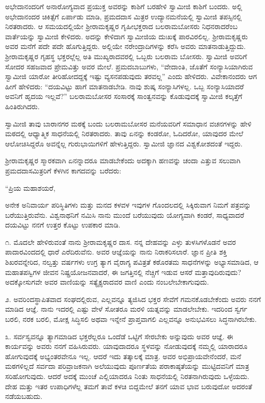  ಅಭೇದಾನಂದರಿಗೆ ಅನಾರೋಗ್ಯವಾದ ಪ್ರಯುಕ್ತ ಅವರನ್ನು ಕಾಶಿಗೆ ಬರಹೇಳಿ ಸ್ವಾಮೀಜಿ ಕಾಶಿಗೆ ಬಂದರು. ಅಲ್ಲಿ ಅಭೇದಾನಂದರ ಚಿಕಿತ್ಸೆಗೆ ಏರ್ಪಾಡು ಮಾಡಿ, ಪ್ರಮದದಾಸ ಮಿತ್ರರ ಉದ್ಯಾನಮನೆಯಲ್ಲಿ ಸ್ವಾಮೀಜಿ ತಪಸ್ಸಿನಲ್ಲಿ ನಿರತರಾದರು. ಆ ಸಮಯದಲ್ಲಿಯೇ ಶ‍್ರೀರಾಮಕೃಷ್ಣರ ಗೃಹೀಭಕ್ತರಾದ ಬಲರಾಮಬೋಸರು ನಿಧನರಾದರೆಂಬ ವಾರ್ತೆಯನ್ನು ಸ್ವಾಮೀಜಿ ಕೇಳಿದರು. ಅದನ್ನು ಕೇಳಿದಾಗ ಸ್ವಾಮೀಜಿಯ ದುಃಖಕ್ಕೆ ಪಾರವಿರಲಿಲ್ಲ. ಶ‍್ರೀರಾಮಕೃಷ್ಣರು ಅವರ ಮನೆಗೆ ಪದೇ ಪದೇ ಹೊಗುತ್ತಿದ್ದರು. ಅಲ್ಲಿಯೇ ನರೇಂದ್ರಾದಿಗಳನ್ನು ಕರೆಸಿ ಅವರು ಮಾತನಾಡುತ್ತಿದ್ದುದು. ಶ‍್ರೀರಾಮಕೃಷ್ಣರ ಗೃಹಸ್ಥ ಭಕ್ತರಲ್ಲೆಲ್ಲ ಅತಿ ಮುಖ್ಯರಾದವರಲ್ಲಿ ಒಬ್ಬರು ಬಲರಾಮ ಬೋಸರು. ಸ್ವಾಮೀಜಿ ಅವರಿಗೆ ಸೋದರ ಸಹಜವಾದ ಪ್ರೇಮವಿತ್ತು ಅವರ ಮೇಲೆ. ಪ್ರಮದಬಾಬುಗಳು, “ವೇದಾಂತಿ, ಜೊತೆಗೆ ಸಂನ್ಯಾಸಿಯಾಗಿರುವ ಸ್ವಾಮೀಜಿ ಯಾರೋ ತೀರಿಹೋದದ್ದಕ್ಕೆ ಇಷ್ಟು ವ್ಯಸನಪಡುವುದು ತರವಲ್ಲ” ಎಂದು ಹೇಳಿದರು. ವಿವೇಕಾನಂದರು ಆಗ ಹೀಗೆ ಹೇಳಿದರು: “ದಯವಿಟ್ಟು ಹಾಗೆ ಮಾತನಾಡಬೇಡಿ. ನಾವು ಶುಷ್ಕ ಸಂನ್ಯಾಸಿಗಳಲ್ಲ. ಒಬ್ಬ ಸಂನ್ಯಾಸಿಯಾದರೆ ಅವನಿಗೆ ಹೃದಯ ಇಲ್ಲವೆ?” ಬಲರಾಮಬೋಸರ ಸಂಸಾರಕ್ಕೆ ಸಾಂತ್ವನವನ್ನು ಕೊಡುವುದಕ್ಕೆ ಸ್ವಾಮೀಜಿ ಕಲ್ಕತ್ತೆಗೆ ಹಿಂತಿರುಗಿದರು. 

 ಸ್ವಾಮೀಜಿ ತಾವು ಬಾರಾನಗರ ಮಠಕ್ಕೆ ಬಂದು ಬಲರಾಮಬೋಸರ ಮನೆಯವರಿಗೆ ಸಮಾಧಾನ ವಚನಗಳನ್ನು ಹೇಳಿ ಮಠದಲ್ಲಿ ಆಧ್ಯಾತ್ಮಿಕ ಸಾಧನೆಯಲ್ಲಿ ನಿರತರಾದರು. ತಾವು ಏನನ್ನು ಕಂಡರೋ, ಓದಿದರೋ, ಯಾವುದರ ಮೇಲೆ ಆಲೋಚಿಸಿದ್ದರೊ ಅವನ್ನೆಲ್ಲ ಗುರುಭಾಯಿಗಳಿಗೆ ಹೇಳುತ್ತಿದ್ದರು. ಸ್ವಾಮೀಜಿ ಜ್ಞಾನದ ವಿಶ್ವಕೋಶದಂತೆ ಇದ್ದರು. 

 ಶ‍್ರೀರಾಮಕೃಷ್ಣರ ಸ್ಮಾರಕವಾಗಿ ಏನನ್ನಾದರೂ ಮಾಡಬೇಕೆಂದು ಅದಕ್ಕಾಗಿ ಹಣವನ್ನು ಚಂದಾ ಎತ್ತುವ ಸಲುವಾಗಿ ಪ್ರಮದದಾಸಮಿತ್ರರಿಗೆ ಕೆಳಗಿನ ಕಾಗದವನ್ನು ಬರೆದರು: 

 “ಪ್ರಿಯ ಮಹಾಶಯರೆ, 

 ಅನೇಕ ಅನಿವಾರ್ಯ ಪರಿಸ್ಥಿತಿಗಳು ಮತ್ತು ಮನದ ಕಳವಳ ಇವುಗಳ ಗೊಂದಲದಲ್ಲಿ ಸಿಕ್ಕಿರುವಾಗ ನಿಮಗೆ ಪತ್ರವನ್ನು ಬರೆಯುತ್ತಿರುವೆನು. ವಿಶ್ವನಾಥನಿಗೆ ನಮಿಸಿ ನಾನು ಮುಂದೆ ಬರೆಯುವುದು ಯೋಗ್ಯವಾಗಿ ಕಂಡರೆ, ಸಾಧ್ಯವಾದರೆ ದಯವಿಟ್ಟು ನನಗೆ ಉತ್ತರ ಕೊಟ್ಟು ಉಪಕಾರ ಮಾಡಿ. 

 ೧. ಮೊದಲೇ ಹೇಳಿರುವಂತೆ ನಾನು ಶ‍್ರೀರಾಮಕೃಷ್ಣರ ದಾಸ. ನನ್ನ ದೇಹವನ್ನು ಎಳ್ಳು ತುಳಸಿಗಳೊಡನೆ ಅವರ ಪಾದಾರವಿಂದದಲ್ಲಿ ಧಾರೆ ಎರೆದಿರುವೆನು. ಅವರ ಆಜ್ಞೆಯನ್ನು ನಾನು ನಿರಾಕರಿಸಲಾರೆ. ಜ್ಞಾನ ಪ್ರೀತಿ ಶಕ್ತಿ ಶಿಖರವನ್ನೇರಿದ, ನಲ್ವತ್ತು ವರ್ಷಗಳು ಉಗ್ರ ತ್ಯಾಗ ವೈರಾಗ್ಯ ಪವಿತ್ರತೆ ಕಠೊರತಮ ಸಾಧನೆಗಳನ್ನು ಅಭ್ಯಾಸಮಾಡಿದ, ಆ ಮಹಾತಪಸ್ವಿಗಳ ಜೀವನ ನಿಷ್ಪ್ರಯೋಜನವಾದರೆ, ಈ ಜಗತ್ತಿನಲ್ಲಿ ನೆಚ್ಚಿಗೆ ಇಡುವ ಆಸರೆ ಮತ್ತಾವುದಿರುವುದು? ಅದಕ್ಕೋಸುಗವೇ ಅವರ ವಾಣಿಯನ್ನು ಸತ್ಯೈಕ್ಯರಾದವರ ವಾಣಿ ಎಂದು ನಂಬಲೇಬೇಕಾಗುವುದು. 

 ೨. ಅವರಿಂದಸ್ಥಾಪಿತವಾದ ಸಂಘದಲ್ಲಿರುವ, ಎಲ್ಲವನ್ನೂ ತ್ಯಜಿಸಿದ ಭಕ್ತರ ಸೇವೆಗೆ ಗಮನಕೊಡಬೇಕೆಂದು ಅವರು ನನಗೆ ಮಾಡಿದ ಆಜ್ಞೆ. ನಾನು ಇದರಲ್ಲಿ ಎಷ್ಟು ವೇಳೆ ಸೋತರೂ ಮರಳಿ ಯತ್ನವನ್ನು ಮಾಡಲೇಬೇಕು. ಇದರಿಂದ ಸ್ವರ್ಗ ಬರಲಿ, ನರಕ ಬರಲಿ, ಮೋಕ್ಷ ಸಿದ್ಧಿಸಲಿ ಅಥವಾ ಇನ್ನೇನೆ ಪ್ರಾಪ್ತವಾಗಲಿ ಎಲ್ಲವನ್ನೂ ಅನುಭವಿಸಲು ಸಿದ್ಧನಾಗಿರಬೇಕು. 

 ೩. ಸರ್ವಸ್ವವನ್ನೂ ತ್ಯಾಗಮಾಡಿದ ಭಕ್ತರೆಲ್ಲರೂ ಒಂದೆಡೆ ಒಟ್ಟಿಗೆ ಸೇರಬೇಕು ಅನ್ನುವುದು ಅವರ ಆಜ್ಞೆ. ಈ ಕಾರ್ಯವನ್ನು ಅವರು ನನಗೆ ವಹಿಸಿರುವರು. ಯಾವುದಾದರೂ ಸ್ಥಳವನ್ನು ನೋಡುವುದಕ್ಕೆ ನಮ್ಮಲ್ಲಿ ಯಾರಾದರೂ ಹೋಗುವುದಕ್ಕೆ ಅಭ್ಯಂತರವೇನೂ ಇಲ್ಲ. ಆದರೆ ಇದು ತತ್ಕಾಲಕ್ಕೆ ಮಾತ್ರ. ಅವರ ಅಭಿಪ್ರಾಯವೇನೆಂದರೆ, ಮನೆ ಮಠಗಳಿಲ್ಲದೆ ಸರ್ವದಾ ಪರಿವ್ರಾಜಕನಾಗಿ ಅಲೆಯುವುದು ಪೂರ್ಣತೆಯ ಪರಾಕಾಷ್ಠತೆಯನ್ನು ಮುಟ್ಟಿದವನಿಗೆ ಮಾತ್ರ ಸರಿಹೋಗುವುದು. ಆದರೆ ಅದಕ್ಕೆ ಮುಂಚೆ ಎಲ್ಲಿಯಾದರೂ ನಿಂತು ಸಾಧನೆಯಲ್ಲಿ ನಿರತನಾಗಿರುವುದು ಒಳ್ಳೆಯದು. ದೇಹ ಮತ್ತು ಇತರ ಉಪಾಧಿಗಳೆಲ್ಲ ತಮಗೆ ತಾವೆ ಕಳಚಿ ಬಿದ್ದಮೇಲೆ ತನಗೆ ಯಾವ ಭಾವ ಬರುವುದೋ ಅದರಂತೆ ನಡೆಯಬಹುದು. 

